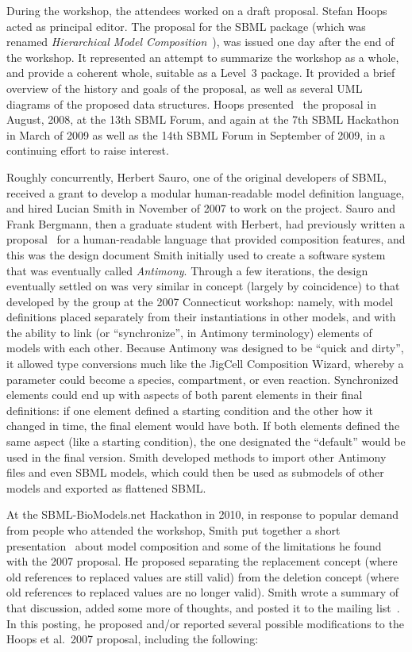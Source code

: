 During the workshop, the attendees worked on a draft proposal.  Stefan
Hoops acted as principal editor.  The proposal for the SBML package
(which was renamed \emph{Hierarchical Model
  Composition}~\citep{hoops:2007}), was issued one day after the end of
the workshop.  It represented an attempt to summarize the workshop as a
whole, and provide a coherent whole, suitable as a Level~3 package.  It
provided a brief overview of the history and goals of the proposal, as
well as several UML diagrams of the proposed data structures.  Hoops
presented~\citep{hoops:2008} the proposal in August, 2008, at the 13th
SBML Forum, and again at the 7th SBML Hackathon in March of 2009 as well
as the 14th SBML Forum in September of 2009, in a continuing effort to
raise interest.

Roughly concurrently, Herbert Sauro, one of the original developers of
SBML, received a grant to develop a modular human-readable model
definition language, and hired Lucian Smith in November of 2007 to work
on the project.  Sauro and Frank Bergmann, then a graduate student with
Herbert, had previously written a proposal~\citep{bergmann:2006} for a
human-readable language that provided composition features, and this was
the design document Smith initially used to create a software system
that was eventually called \emph{Antimony}. Through a few iterations,
the design eventually settled on was very similar in concept (largely by
coincidence) to that developed by the group at the 2007 Connecticut
workshop: namely, with model definitions placed separately from their
instantiations in other models, and with the ability to link (or
``synchronize'', in Antimony terminology) elements of models with each
other.  Because Antimony was designed to be ``quick and dirty'', it
allowed type conversions much like the JigCell Composition Wizard,
whereby a parameter could become a species, compartment, or even
reaction.  Synchronized elements could end up with aspects of both
parent elements in their final definitions: if one element defined a
starting condition and the other how it changed in time, the final
element would have both.  If both elements defined the same aspect (like
a starting condition), the one designated the ``default'' would be used
in the final version.  Smith developed methods to import other Antimony
files and even SBML models, which could then be used as submodels of
other models and exported as flattened SBML.

At the SBML-BioModels.net Hackathon in 2010, in response to popular
demand from people who attended the workshop, Smith put together a short
presentation~\citep{smith:2010} about model composition and some of the
limitations he found with the 2007 proposal.  He proposed separating the
replacement concept (where old references to replaced values are still
valid) from the deletion concept (where old references to replaced
values are no longer valid).  Smith wrote a summary of that discussion,
added some more of thoughts, and posted it to the
 mailing
list~\citep{smith:2010b}.  In this posting, he proposed and/or reported
several possible modifications to the Hoops et al.\ 2007 proposal,
including the following:

